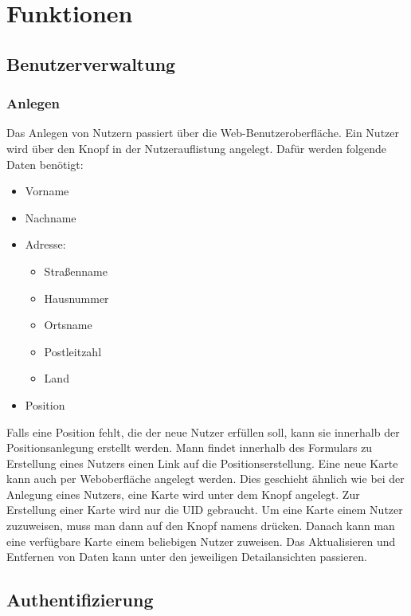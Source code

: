 \documentclass[../main.tex]{subfiles}
\begin{document}
\section{Funktionen}

\subsection{Benutzerverwaltung}

\subsubsection{Anlegen}
Das Anlegen von Nutzern passiert über die Web-Benutzeroberfläche. Ein Nutzer wird über den Knopf  in der Nutzerauflistung angelegt. Dafür werden folgende Daten benötigt: 

\begin{itemize}
  \item Vorname
  \item Nachname
  \item Adresse:
  \begin{itemize}
      \item Straßenname
      \item Hausnummer
      \item Ortsname
      \item Postleitzahl
      \item Land
  \end{itemize}
  \item Position
\end{itemize}

\noindent Falls eine Position fehlt, die der neue Nutzer erfüllen soll, kann sie innerhalb der Positionsanlegung erstellt werden. Mann findet innerhalb des Formulars zu Erstellung eines Nutzers einen Link auf die Positionserstellung. Eine neue Karte kann auch per Weboberfläche angelegt werden. Dies geschieht ähnlich wie bei der Anlegung eines Nutzers, eine Karte wird unter dem Knopf  angelegt. Zur Erstellung einer Karte wird nur die UID gebraucht. Um eine Karte einem Nutzer zuzuweisen, muss man dann auf den Knopf namens  drücken. Danach kann man eine verfügbare Karte einem beliebigen Nutzer zuweisen.
Das Aktualisieren und Entfernen von Daten kann unter den jeweiligen Detailansichten passieren.

\subsection{Authentifizierung}
\end{document}

